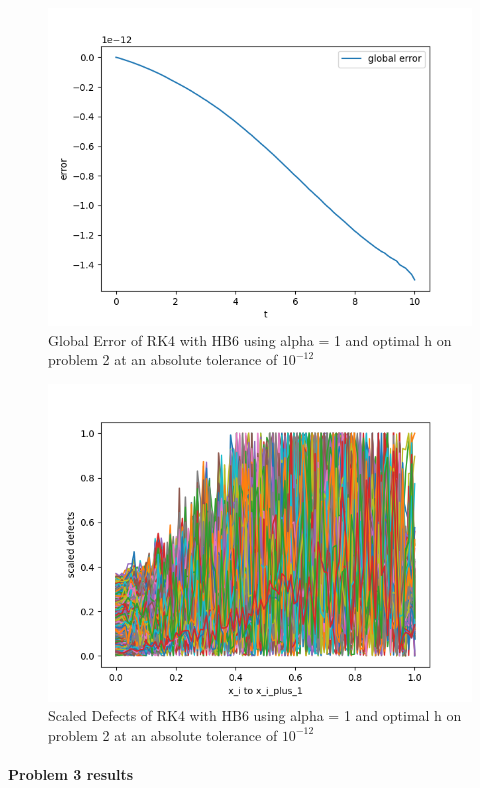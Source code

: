 \documentclass{article}
\begin{document}
\begin{figure}[H]
\centering
\includegraphics[width=0.7\linewidth]{./figures/sharp_tolerance_rk4_with_hb6_p2_global_error}
\caption{Global Error of RK4 with HB6 using alpha = 1 and optimal h on problem 2 at an absolute tolerance of $10^{-12}$}
\label{fig:sharp_tolerance_rk4_with_hb6_p2_global_error}
\end{figure}

\begin{figure}[H]
\centering
\includegraphics[width=0.7\linewidth]{./figures/sharp_tolerance_rk4_with_hb6_p2_scaled_defects}
\caption{Scaled Defects of RK4 with HB6 using alpha = 1 and optimal h on problem 2 at an absolute tolerance of $10^{-12}$}
\label{fig:sharp_tolerance_rk4_with_hb6_p2_scaled_defects}
\end{figure}

\paragraph{Problem 3 results}
\end{document}
